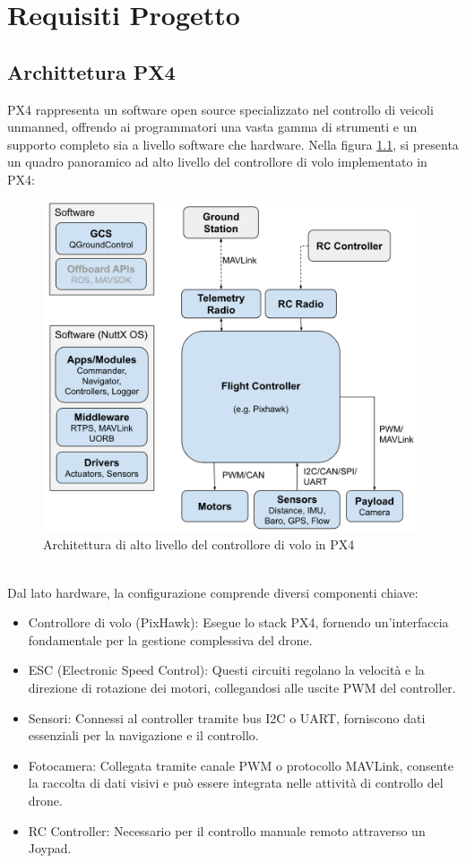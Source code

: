 \chapter{Requisiti Progetto}
\section{Archittetura PX4}
PX4 rappresenta un software open source specializzato nel controllo di veicoli unmanned, offrendo ai programmatori una vasta gamma di strumenti e un supporto completo sia a livello software che hardware. Nella figura \ref{fig:PX4_Arch}, si presenta un quadro panoramico ad alto livello del controllore di volo implementato in PX4:
\begin{figure}[h]
    \centering
    \includegraphics[width=0.7\linewidth]{PX4_Architettura.png}
    \caption{Architettura di alto livello del controllore di volo in PX4}
    \label{fig:PX4_Arch}
\end{figure}
\\
Dal lato hardware, la configurazione comprende diversi componenti chiave:
\begin{itemize}
    \item Controllore di volo (PixHawk): Esegue lo stack PX4, fornendo un'interfaccia fondamentale per la gestione complessiva del drone.
    \item ESC (Electronic Speed Control): Questi circuiti regolano la velocità e la direzione di rotazione dei motori, collegandosi alle uscite PWM del controller.
    \item Sensori: Connessi al controller tramite bus I2C o UART, forniscono dati essenziali per la navigazione e il controllo.
    \item Fotocamera: Collegata tramite canale PWM o protocollo MAVLink, consente la raccolta di dati visivi e può essere integrata nelle attività di controllo del drone.
    \item RC Controller: Necessario per il controllo manuale remoto attraverso un Joypad.
\end{itemize}
